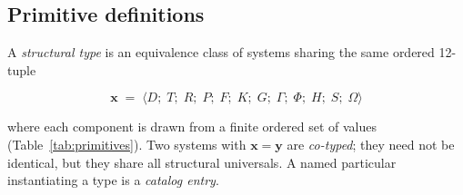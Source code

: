 \documentclass[12pt,a4paper]{article}
\newcommand{\xvec}{\mathbf{x}}
\newcommand{\yvec}{\mathbf{y}}
\begin{document}
\subsection{Primitive definitions}

A \emph{structural type} is an equivalence class of systems sharing
the same ordered 12-tuple

\begin{equation}
  \xvec \;=\; \langle D;\; T;\; R;\; P;\; F;\; K;\; G;\; \Gamma;\;
  \Phi;\; H;\; S;\; \Omega \rangle
  \label{eq:tuple}
\end{equation}

\noindent
where each component is drawn from a finite ordered set of values
(Table~\ref{tab:primitives}). Two systems with $\xvec = \yvec$ are
\emph{co-typed}; they need not be identical, but they share all
structural universals. A named particular instantiating a type is a
\emph{catalog entry}.
\end{document}
